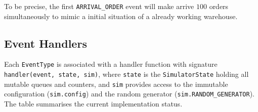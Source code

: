 \documentclass[a4paper,10pt]{article}
\begin{document}
To be precise, the first \texttt{ARRIVAL\_ORDER} event will make arrive $100$ orders simultaneously to mimic a initial situation of a already working warehouse.


\subsection{Event Handlers}

Each \texttt{EventType} is associated with a handler function with signature \texttt{handler(event, state, sim)}, where \texttt{state} is the \texttt{SimulatorState} holding all mutable queues and counters, and \texttt{sim} provides access to the immutable configuration (\texttt{sim.config}) and the random generator (\texttt{sim.RANDOM\_GENERATOR}). The table summarises the current implementation status.
\end{document}
